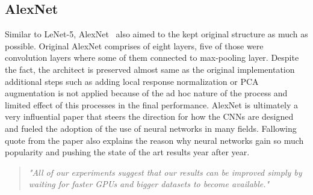 \subsection{AlexNet}
Similar to LeNet-5, AlexNet~\cite{Alexnet} also aimed to the kept original structure as much as possible.
Original AlexNet comprises of eight layers, five of those were convolution layers where some of them connected to max-pooling layer. 
Despite the fact, the architect is preserved almost same as the original implementation additional steps such as adding local response normalization or PCA augmentation is not applied because of the ad hoc nature of the process and limited effect of this processes in the final performance.
AlexNet is ultimately a very influential paper that steers the direction for how the CNNs are designed and fueled the adoption of the use of neural networks in many fields.
Fallowing quote from the paper also explains the reason why neural networks gain so much popularity and pushing the state of the art results year after year.
\begin{quote}
    \textit{"All of our experiments suggest that our results
can be improved simply by waiting for faster GPUs and bigger datasets to become available."}
\end{quote}

